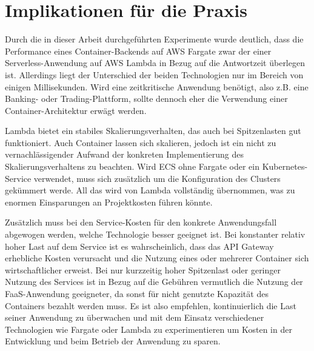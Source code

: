 \section{Implikationen für die Praxis}
Durch die in dieser Arbeit durchgeführten Experimente wurde deutlich, dass die Performance eines Container-Backends auf AWS Fargate zwar der einer Serverless-Anwendung auf AWS Lambda in Bezug auf die Antwortzeit überlegen ist. Allerdings liegt der Unterschied der beiden Technologien nur im Bereich von einigen Millisekunden. Wird eine zeitkritische Anwendung benötigt, also z.B. eine Banking- oder Trading-Plattform, sollte dennoch eher die Verwendung einer Container-Architektur erwägt werden.

Lambda bietet ein stabiles Skalierungsverhalten, das auch bei Spitzenlasten gut funktioniert. Auch Container lassen sich skalieren, jedoch ist ein nicht zu vernachlässigender Aufwand der konkreten Implementierung des Skalierungsverhaltens zu beachten. Wird ECS ohne Fargate oder ein Kubernetes-Service verwendet, muss sich zusätzlich um die Konfiguration des Clusters gekümmert werde. All das wird von Lambda vollständig übernommen, was zu enormen Einsparungen an Projektkosten führen könnte. 

Zusätzlich muss bei den Service-Kosten für den konkrete Anwendungsfall abgewogen werden, welche Technologie besser geeignet ist. Bei konstanter relativ hoher Last auf dem Service ist es wahrscheinlich, dass das API Gateway erhebliche Kosten verursacht und die Nutzung eines oder mehrerer Container sich wirtschaftlicher erweist. Bei nur kurzzeitig hoher Spitzenlast oder geringer Nutzung des Services ist in Bezug auf die Gebühren vermutlich die Nutzung der FaaS-Anwendung geeigneter, da sonst für nicht genutzte Kapazität des Containers bezahlt werden muss. 
Es ist also empfehlen, kontinuierlich die Last seiner Anwendung zu überwachen und mit dem Einsatz verschiedener Technologien wie Fargate oder Lambda zu experimentieren um Kosten in der Entwicklung und beim Betrieb der Anwendung zu sparen.

